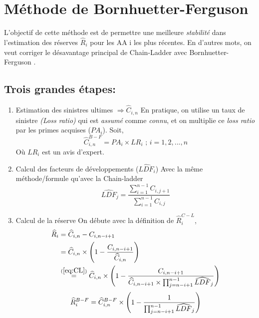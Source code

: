 \documentclass[11pt,french]{report}
\begin{document}
\newpage
\section{Méthode de Bornhuetter-Ferguson}

L'objectif de cette méthode est de permettre une meilleure \emph{stabilité} dans l'estimation des réserves $\widehat{R}_i $ pour les AA i les plus récentes.
En d'autres mots, on veut corriger le désavantage principal de Chain-Ladder avec Bornhuetter-Ferguson .

\subsection*{Trois grandes étapes:}
\begin{enumerate}
\item Estimation des sinistres ultimes $\Rightarrow \widehat{C}_{i,n}$ \newline
En pratique, on utilise un taux de sinistre \emph{(Loss ratio)} qui est \textit{assumé} comme \textit{connu}, et on multiplie ce \emph{loss ratio} par les primes acquises ($PA_i$). Soit,
$$ \widehat{C}_{i,n}^{B-F} = PA_i \times LR_i \text{ ; } i = 1,2,...,n$$ 
Où $LR_i$ est un avis d'expert.

\item Calcul des facteurs de développements ($\widehat{LDF}_i$) \newline
Avec la même méthode/formule qu'avec la Chain-ladder
$$ \widehat{LDF}_j = \frac{\sum_{i = 1}^{n-1} C_{i, j+1}}{\sum_{i = 1}^{n-1} C_{i, j}}$$

\item Calcul de la réserve \newline
On débute avec la définition de $\widehat{R}_i^{C-L}$,
\begin{align*}
\widehat{R}_i &= \widehat{C}_{i,n} - C_{i, n-i+1} \\
&= \widehat{C}_{i,n} \times \Bigg( 1 - \frac{C_{i, n-i+1}}{\widehat{C}_{i,n}}\Bigg) \\
&\overset{(\ref{eq:CL})}{=} \widehat{C}_{i,n} \times \Bigg( 1 - \frac{C_{i, n-i+1}}{\widehat{C}_{i,n -i + 1} \times \prod_{j = n - i + 1}^{n- 1} \widehat{LDF}_j}\Bigg)  \\
\end{align*}
\begin{equation}
\label{eq:BFmet}
\widehat{R}_i^{B-F} = \widehat{C}_{i,n}^{B-F} \times \Bigg( 1 - \frac{1}{\prod_{j = n - i + 1}^{n- 1} \widehat{LDF}_j}\Bigg)  \\
\end{equation}
\end{enumerate}
\end{document}
